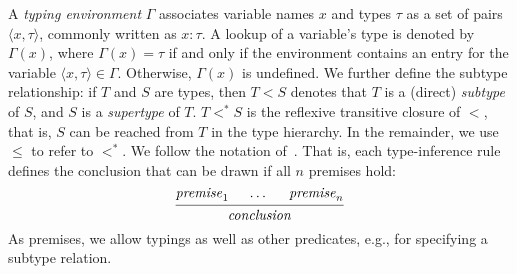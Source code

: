   A \emph{typing environment} $\Gamma$ associates variable names $x$ and types $\tau$
  as a set of pairs $\langle x, \tau \rangle$, commonly written as $x : \tau$. A
  lookup of a variable's type is denoted by $\Gamma(x)$, where $\Gamma(x) = \tau$ if
  and only if the environment contains an entry for the variable $\langle x, \tau
  \rangle \in \Gamma$. Otherwise, $\Gamma(x)$ is undefined.
  We further define the subtype relationship: if $T$ and $S$ are types, then
  ${T}<{S}$ denotes that $T$ is a (direct) \emph{subtype} of $S$, and $S$ is a
  \emph{supertype} of $T$. ${T}{<^{*}}{S}$ is the reflexive transitive closure of $<$,
  that is, $S$ can be reached from $T$ in the type hierarchy. In the remainder, we
  use $\leq$ to refer to ${<^{*}}$.
  We follow the notation of~\cite{Clement1986}. That is, each type-inference rule
  defines the conclusion that can be drawn if all $n$ premises hold:
  \[
    \begin{prooftree}
      \Hypo{\mathit{premise}_1}
      \Hypo{\dots}
      \Hypo{\mathit{premise}_n}
      \Infer3{\mathit{conclusion}}
    \end{prooftree}
  \]
  As premises, we allow typings as well as other predicates, e.g., for specifying a
  subtype relation.
